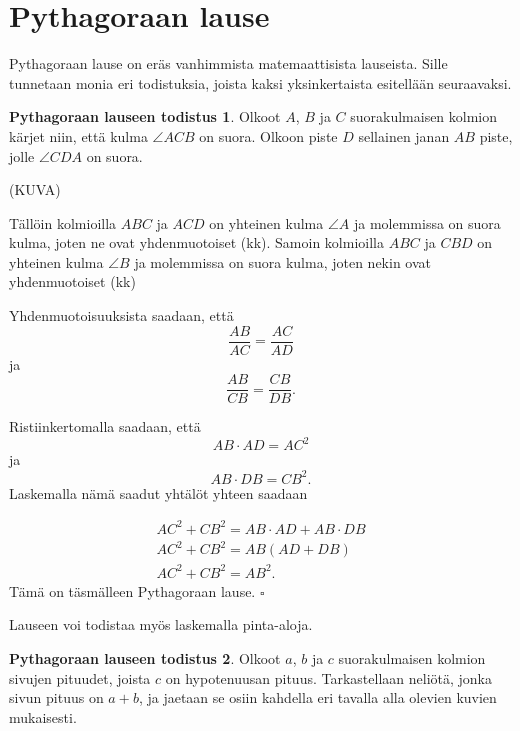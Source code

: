\section*{Pythagoraan lause}

Pythagoraan lause on eräs vanhimmista matemaattisista lauseista. Sille tunnetaan monia eri
todistuksia, joista kaksi yksinkertaista esitellään seuraavaksi.


\textbf{Pythagoraan lauseen todistus 1}. Olkoot $A$, $B$ ja $C$ suorakulmaisen kolmion
kärjet niin, että kulma $\angle ACB$ on suora. Olkoon piste $D$ sellainen janan $AB$ piste,
jolle $\angle CDA$ on suora.

(KUVA)

Tällöin kolmioilla $ABC$ ja $ACD$ on yhteinen kulma $\angle A$ ja molemmissa on suora kulma, joten ne ovat yhdenmuotoiset (kk). Samoin kolmioilla $ABC$ ja $CBD$ on yhteinen kulma
$\angle B$ ja molemmissa on suora kulma, joten nekin ovat yhdenmuotoiset (kk)

Yhdenmuotoisuuksista saadaan, että
\[
\frac{AB}{AC} = \frac{AC}{AD}
\]
ja
\[
\frac{AB}{CB} = \frac{CB}{DB}.
\]

Ristiinkertomalla saadaan, että
\[
AB \cdot AD = AC^2
\]
ja
\[
AB \cdot DB = CB^2.
\]
Laskemalla nämä saadut yhtälöt yhteen saadaan

\begin{align*}
AC^2 + CB^2  = AB \cdot AD + AB \cdot DB \\
AC^2 + CB^2  = AB(AD + DB) \\
AC^2 + CB^2  = AB^2.
\end{align*}
Tämä on täsmälleen Pythagoraan lause. $\square $

Lauseen voi todistaa myös laskemalla pinta-aloja.

\textbf{Pythagoraan lauseen todistus 2}. Olkoot $a$, $b$ ja $c$ suorakulmaisen kolmion
sivujen pituudet, joista $c$ on hypotenuusan pituus. Tarkastellaan neliötä, jonka sivun
pituus on $a+b$, ja jaetaan se osiin kahdella eri tavalla alla olevien kuvien mukaisesti.

